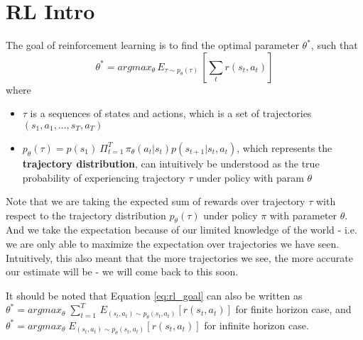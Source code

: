 \documentclass[11pt]{article} %
\begin{document}

\section{RL Intro}
The goal of reinforcement learning is to find the optimal parameter $\theta^*$, such that 
\begin{equation}\label{eq:rl_goal}
    \theta^* = argmax_\theta\, E_{\tau \sim p_\theta(\tau)}\,[\sum_t r(s_t, a_t)]
\end{equation}
where
\begin{itemize}
    \item $\tau$ is a sequences of states and actions, which is a set of trajectories $(s_1, a_1, ..., s_T, a_T)$
    \item $p_\theta(\tau) = p(s_1)\: \Pi^T_{t=1}\,\pi_\theta(a_t|s_t)p(s_{t+1}|s_t, a_t)$, which represents the \textbf{trajectory distribution}, can intuitively be understood as the true probability of experiencing trajectory $\tau$ under policy with param $\theta$
\end{itemize}
Note that we are taking the expected sum of rewards over trajectory $\tau$ with respect to the trajectory distribution $p_\theta(\tau)$ under policy $\pi$ with parameter $\theta$. And we take the expectation because of our limited knowledge of the world - i.e. we are only able to maximize the expectation over trajectories we have seen. Intuitively, this also meant that the more trajectories we see, the more accurate our estimate will be - we will come back to this soon.

It should be noted that Equation \ref{eq:rl_goal} can also be written as $\theta^* = argmax_\theta \; \sum_{t=1}^T\, E_{(s_t, a_t) \sim p_\theta(s_t, a_t)}[r(s_t, a_t)]$ for finite horizon case, and $\theta^* = argmax_\theta \; E_{(s_t, a_t) \sim p_\theta(s_t, a_t)}[r(s_t, a_t)]$ for infinite horizon case.
\end{document}
